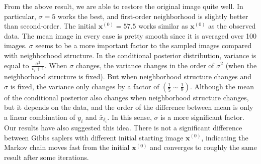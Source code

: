 From the above result, we are able to restore the original image quite well. In particular, $\sigma=5$ works the best, and first-order neighborhood is slightly better than second-order. 
The initial $\mathbf{x}^{(0)}=57.5$ works similar as $\mathbf{x}^{(0)}$ as the observed data. The mean image in every case is pretty smooth since it is averaged over 100 images.
$\sigma$ seems to be a more important factor to the sampled images compared with neighborhood structure.
In the conditional posterior distribution, variance is equal to $\frac{\sigma^2}{v_i+1}$.
When $\sigma$ changes, the variance changes in the order of $\sigma^2$ (when the neighborhood structure is fixed). 
But when neighborhood structure changes and $\sigma$ is fixed, the variance only changes by a factor of $(\frac{1}{5}\sim\frac{1}{9})$.
Although the mean of the conditional posterior also changes when neighborhood structure changes, but it depends on the data, and the order of the difference between mean is only a linear combination of $y_i$ and $\bar{x}_{\delta_i}$. In this sense, $\sigma$ is a more significant factor. Our results have also suggested this idea. 
There is not a significant difference between Gibbs saplers with different initial starting image $\mathbf{x}^{(0)}$, indicating the Markov chain moves fast from the initial $\mathbf{x}^{(0)}$ and converges to roughly the same result after some iterations. 